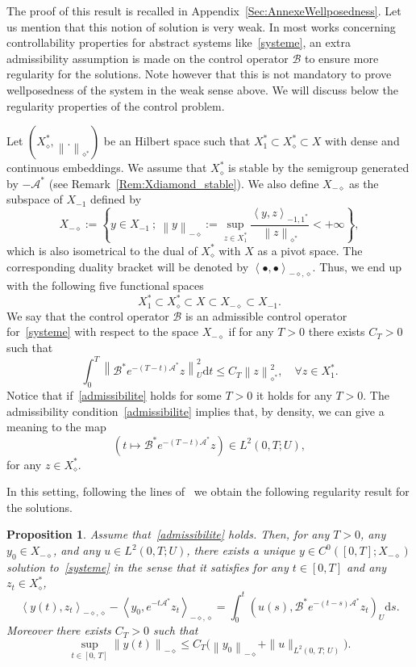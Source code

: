 \documentclass[11pt]{article}
\newtheorem{prop}[theo]{Proposition}
\theoremstyle{definition}
\numberwithin{equation}{section}
\numberwithin{figure}{section}
\numberwithin{table}{section}
\newcommand\As{\mathcal{A}^*}
\newcommand\B{\mathcal{B}}
\newcommand\Bs{\mathcal{B}^*}
\newcommand{\Xuns}{X_1^*}
\newcommand{\Xmun}{X_{-1}}
\newcommand{\Xalphas}{X_\diamond^*}
\newcommand{\Xmalpha}{X_{-\diamond}}
\newcommand{\normeU}[1]{\left\| #1 \right\|_U}
\newcommand{\normeXalphas}[1]{\left\| #1 \right\|_{\diamond^*}}
\newcommand{\normeXmalpha}[1]{\left\| #1 \right\|_{-\diamond}}
\newcommand{\psU}[2]{\left(#1, #2 \right)_U}
\newcommand{\dual}[2]{\left\langle #1, #2 \right\rangle_{-\diamond,\diamond}}
\newcommand{\dualX}[2]{\left\langle #1, #2 \right\rangle_{-1,1^*}}
\newcommand{\md}{\mathrm{d}}
\renewcommand{\cdot}{{\scriptstyle \bullet}}
\let\oldforall\forall
\renewcommand*{\forall}{\mathrel{\oldforall}}
\begin{document}
The proof of this result is recalled in Appendix~\ref{Sec:AnnexeWellposedness}. Let us mention that this notion of solution is very weak. In most works concerning controllability properties for abstract systems like~\eqref{systeme}, an extra admissibility assumption is made on the control operator $\B$ to ensure more regularity for the solutions. Note however that this is not mandatory to prove wellposedness of the system in the weak sense above. We will discuss below the regularity properties of the control problem.

Let $(\Xalphas, \normeXalphas{.})$ be an Hilbert space such that $\Xuns \subset \Xalphas \subset X$ with dense and continuous embeddings. We assume that $\Xalphas$ is stable by the semigroup generated by $-\As$ (see Remark~\ref{Rem:Xdiamond_stable}). We also define $\Xmalpha$ as the subspace of $\Xmun$ defined by
\begin{equation*}\label{Def:X-alpha}
\Xmalpha := \left\{ y \in \Xmun \: ; \: \normeXmalpha{y} := \sup\limits_{z \in \Xuns} \frac{\dualX{y}{z}}{\normeXalphas{z}} < + \infty \right\},
\end{equation*}
which is also isometrical to the dual of $\Xalphas$ with $X$ as a pivot space. The corresponding duality bracket will be denoted by $\dual{\cdot}{\cdot}$. Thus, we end up with the following five functional spaces
\begin{equation*}\label{QuintupleDualite}
\Xuns \subset \Xalphas \subset X \subset \Xmalpha \subset \Xmun.
\end{equation*}
We say that the control operator $\B$ is an admissible control operator for~\eqref{systeme} with respect to the space $\Xmalpha$ if for any $T>0$ there exists $C_T >0$ such that
\begin{equation}\label{admissibilite}
\int_0^T \normeU{\Bs e^{-(T-t)\As} z}^2 \md t \leq C_T \normeXalphas{ z }^2, \quad \forall z \in \Xuns.
\end{equation}
Notice that if~\eqref{admissibilite} holds for some $T>0$ it holds for any $T>0$. The admissibility condition~\eqref{admissibilite} implies that, by density, we can give a meaning to the map
\[
\left(t \mapsto \Bs e^{-(T-t) \As} z \right) \in L^2(0,T ; U),
\]
for any $z\in \Xalphas$.

In this setting, following the lines of~\cite[Theorem~2.37]{CoronBook} we obtain the following regularity result for the solutions.

\begin{prop}\label{Prop:Wellposedness}
Assume that~\eqref{admissibilite} holds. Then, for any $T>0$, any\linebreak$y_0 \in \Xmalpha$, and any $u \in L^2(0,T ; U)$, there exists a unique $y \in C^0([0,T]; \Xmalpha)$ solution to~\eqref{systeme} in the sense that it satisfies for any $t \in [0,T]$ and any $z_t \in \Xalphas$,
\begin{equation*}\label{CaracterisationDualeSolutions}
\dual{y(t)}{z_t} - \dual{y_0}{e^{-t\As} z_t} = \int_0^t \psU{u(s)}{ \Bs e^{-(t-s) \As} z_t} \md s.
\end{equation*}
Moreover there exists $C_T>0$ such that
\[
\sup\limits_{t \in [0,\,T]} \normeXmalpha{y(t)} \leq C_T \big(\normeXmalpha{y_0} + \| u \|_{L^2(0,\,T;\,U)} \big).
\]
\end{prop}
\end{document}
